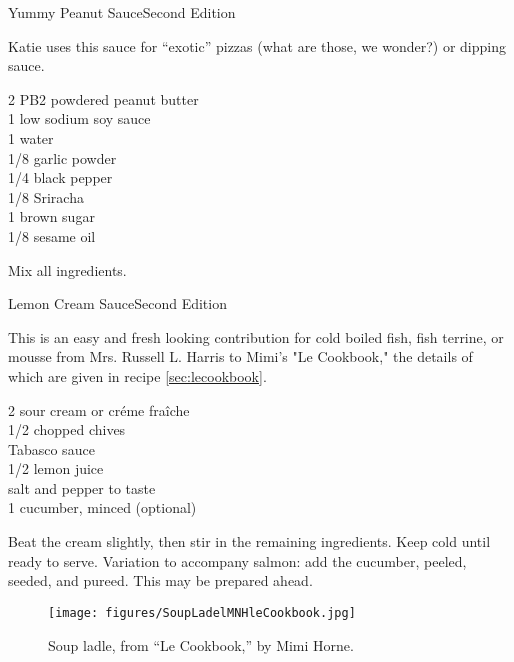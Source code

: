 \begin{entry}{Yummy Peanut Sauce}{Second Edition}

\begin{open}
 Katie uses this sauce for ``exotic'' pizzas (what are those, we wonder?) or dipping sauce.
\end{open}
\begin{ingredients}
  \SI{2}{\tblspoon} PB2 powdered peanut butter \\
  \SI{1}{\teaspoon} low sodium soy sauce \\
  \SI{1}{\tblspoon} water \\
  \SI{1/8}{\teaspoon} garlic powder \\
 \SI{1/4}{\teaspoon} black pepper \\
  \SI{1/8}{\teaspoon} Sriracha \\
 \SI{1}{\tblspoon} brown sugar \\
   \SI{1/8}{\teaspoon} sesame oil
\end{ingredients}

Mix all ingredients.

\end{entry}

\begin{entry}{Lemon Cream Sauce}{Second Edition}

\begin{open}
 This is an easy and fresh looking contribution for cold boiled fish, fish terrine, or mousse from Mrs. Russell L. Harris to Mimi's "Le Cookbook," the details of which are given in recipe \ref{sec:lecookbook}.
\end{open}
\begin{ingredients}
   \SI{2}{\cup} sour cream or cr\'eme fra\^iche \\
  \SI{1/2}{\cup} chopped chives \\
  Tabasco sauce \\
  \SI{1/2}{\cup} lemon juice \\
  salt and pepper to taste \\
 \SI{1}{\cup} cucumber, minced (optional)

\end{ingredients}

Beat the cream slightly, then stir in the remaining ingredients. Keep cold until ready to serve. Variation to accompany salmon: add the cucumber, peeled, seeded, and pureed. This may be prepared ahead.

\begin{figure}
    \centering
    \texttt{[image: figures/SoupLadelMNHleCookbook.jpg]}
    \caption{Soup ladle, from ``Le Cookbook,'' by Mimi Horne.}
    \label{fig:mimi_ladel}
\end{figure}
\end{entry}


